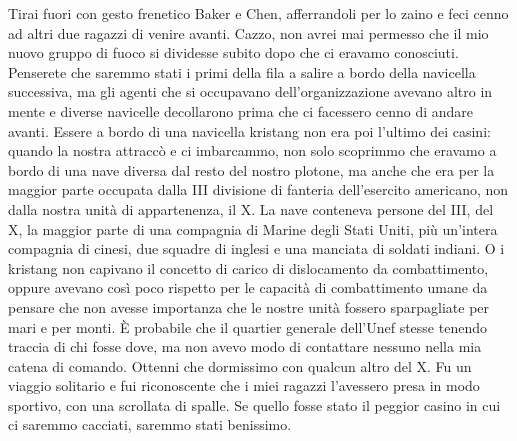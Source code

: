 Tirai fuori con gesto frenetico Baker e Chen, afferrandoli per lo zaino
e feci cenno ad altri due ragazzi di venire avanti. Cazzo, non avrei mai
permesso che il mio nuovo gruppo di fuoco si dividesse subito dopo che
ci eravamo conosciuti. Penserete che saremmo stati i primi della fila a
salire a bordo della navicella successiva, ma gli agenti che si
occupavano dell'organizzazione avevano altro in mente e diverse
navicelle decollarono prima che ci facessero cenno di andare avanti.
Essere a bordo di una navicella kristang non era poi l'ultimo dei
casini: quando la nostra attraccò e ci imbarcammo, non solo scoprimmo
che eravamo a bordo di una nave diversa dal resto del nostro plotone, ma
anche che era per la maggior parte occupata dalla III divisione di
fanteria dell'esercito americano, non dalla nostra unità di
appartenenza, il X. La nave conteneva persone del III, del X, la maggior
parte di una compagnia di Marine degli Stati Uniti, più un'intera
compagnia di cinesi, due squadre di inglesi e una manciata di soldati
indiani. O i kristang non capivano il concetto di carico di dislocamento
da combattimento, oppure avevano così poco rispetto per le capacità di
combattimento umane da pensare che non avesse importanza che le nostre
unità fossero sparpagliate per mari e per monti. È probabile che il
quartier generale dell'Unef stesse tenendo traccia di chi fosse dove, ma
non avevo modo di contattare nessuno nella mia catena di comando.
Ottenni che dormissimo con qualcun altro del X. Fu un viaggio solitario
e fui riconoscente che i miei ragazzi l'avessero presa in modo sportivo,
con una scrollata di spalle. Se quello fosse stato il peggior casino in
cui ci saremmo cacciati, saremmo stati benissimo.